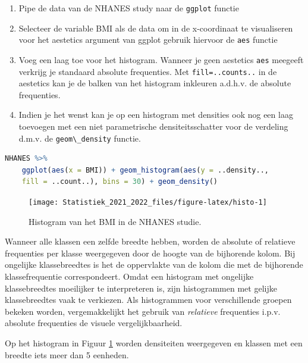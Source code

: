 \documentclass[
  12pt,dutch,coursenotes]{book}
\newcommand{\passthrough}[1]{#1}
\providecommand{\tightlist}{%
  \setlength{\itemsep}{0pt}\setlength{\parskip}{0pt}}
\theoremstyle{definition}
\theoremstyle{definition}
\theoremstyle{definition}
\theoremstyle{definition}
\theoremstyle{remark}
\begin{document}
\begin{enumerate}
\def\labelenumi{\arabic{enumi}.}
\tightlist
\item
  Pipe de data van de NHANES study naar de \passthrough{\lstinline!ggplot!} functie
\item
  Selecteer de variable BMI als de data om in de x-coordinaat te visualiseren voor het aestetics argument van ggplot gebruik hiervoor de \passthrough{\lstinline!aes!} functie
\item
  Voeg een laag toe voor het histogram. Wanneer je geen aestetics \passthrough{\lstinline!aes!} meegeeft verkrijg je standaard absolute frequenties. Met \passthrough{\lstinline!fill=..counts..!} in de aestetics kan je de balken van het histogram inkleuren a.d.h.v. de absolute frequenties.
\item
  Indien je het wenst kan je op een histogram met densities ook nog een laag toevoegen met een niet parametrische densiteitsschatter voor de verdeling d.m.v. de \passthrough{\lstinline!geom\_density!} functie.
\end{enumerate}

\begin{lstlisting}[language=R]
NHANES %>%
    ggplot(aes(x = BMI)) + geom_histogram(aes(y = ..density..,
    fill = ..count..), bins = 30) + geom_density()
\end{lstlisting}

\begin{figure}

{\centering \texttt{[image: Statistiek\_2021\_2022\_files/figure-latex/histo-1]} 

}

\caption{Histogram van het BMI in de NHANES studie.}\label{fig:histo}
\end{figure}

Wanneer alle klassen
een zelfde breedte hebben, worden de absolute of relatieve frequenties per
klasse weergegeven door de hoogte van de bijhorende kolom. Bij ongelijke
klassebreedtes is het de oppervlakte van de kolom die met de bijhorende
klassefrequentie correspondeert. Omdat een histogram met ongelijke
klassebreedtes moeilijker te interpreteren is, zijn histogrammen met gelijke
klassebreedtes vaak te verkiezen. Als histogrammen voor verschillende
groepen bekeken worden, vergemakkelijkt het gebruik van \emph{relatieve}
frequenties i.p.v. absolute frequenties de visuele vergelijkbaarheid.

Op het histogram in Figuur \ref{fig:histo} worden densiteiten
weergegeven en klassen met een breedte iets meer dan 5 eenheden.
\end{document}
